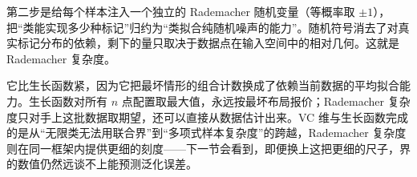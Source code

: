 第二步是给每个样本注入一个独立的 Rademacher 随机变量（等概率取 \(\pm 1\)），把``类能实现多少种标记''归约为``类拟合纯随机噪声的能力''。随机符号消去了对真实标记分布的依赖，剩下的量只取决于数据点在输入空间中的相对几何。这就是 Rademacher 复杂度。

它比生长函数紧，因为它把最坏情形的组合计数换成了依赖当前数据的平均拟合能力。生长函数对所有 \(n\) 点配置取最大值，永远按最坏布局报价；Rademacher 复杂度只对手上这批数据取期望，还可以直接从数据估计出来。VC 维与生长函数完成的是从``无限类无法用联合界''到``多项式样本复杂度''的跨越，Rademacher 复杂度则在同一框架内提供更细的刻度——下一节会看到，即便换上这把更细的尺子，界的数值仍然远谈不上能预测泛化误差。
